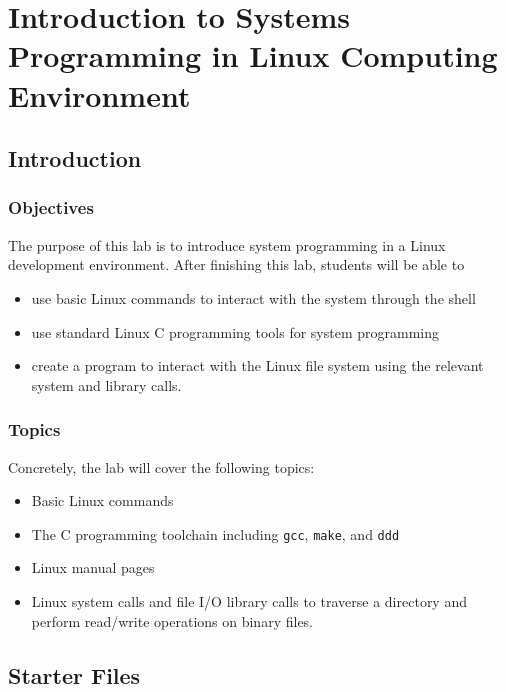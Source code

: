 \chapter{Introduction to Systems Programming in Linux Computing Environment}
\section{Introduction}
\subsection{Objectives}
The purpose of this lab is to introduce system programming in a Linux development environment. After finishing this lab, students will be able to
\begin{itemize}
   \item use basic Linux commands to interact with the system through the shell
   \item use standard Linux C programming tools for system programming
   \item create a program to interact with the Linux file system using the relevant system and library calls.
\end{itemize}

\subsection{Topics}
Concretely, the lab will cover the following topics:
\begin{itemize}
  \item Basic Linux commands
  \item The C programming toolchain including \verb+gcc+, \verb+make+, and \verb+ddd+
  \item Linux manual pages
  \item Linux system calls and file I/O library calls to traverse a directory and perform read/write operations on binary files.
  \end{itemize}
  
\section{Starter Files}

